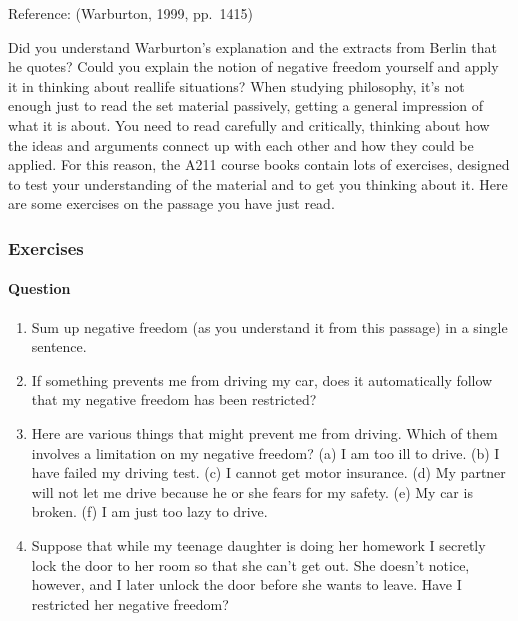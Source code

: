 \documentclass[letterpaper,10pt,english]{sphinxmanual}
\begin{document}
Reference: (Warburton, 1999, pp. 14\textendash{}15)

Did you understand Warburton’s explanation and the extracts from Berlin that he quotes? Could you explain the notion of negative freedom yourself and apply it in thinking about real\sphinxhyphen{}life situations? When studying philosophy, it’s not enough just to read the set material passively, getting a general impression of what it is about. You need to read carefully and critically, thinking about how the ideas and arguments connect up with each other and how they could be applied. For this reason, the
A211 course books contain lots of exercises, designed to test your understanding of the material and to get you thinking about it. Here are some exercises on the passage you have just read.


\subsubsection{Exercises}
\label{\detokenize{content/session_00/Part_00_02:Exercises}}

\paragraph{Question}
\label{\detokenize{content/session_00/Part_00_02:Question}}\begin{enumerate}
%
\item {} 
Sum up negative freedom (as you understand it from this passage) in a single sentence.

\item {} 
If something prevents me from driving my car, does it automatically follow that my negative freedom has been restricted?

\item {} 
Here are various things that might prevent me from driving. Which of them involves a limitation on my negative freedom? (a) I am too ill to drive. (b) I have failed my driving test. (c) I cannot get motor insurance. (d) My partner will not let me drive because he or she fears for my safety. (e) My car is broken. (f) I am just too lazy to drive.

\item {} 
Suppose that while my teenage daughter is doing her homework I secretly lock the door to her room so that she can’t get out. She doesn’t notice, however, and I later unlock the door before she wants to leave. Have I restricted her negative freedom?

\end{enumerate}
\end{document}
